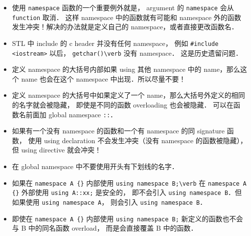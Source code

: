 
\begin{issues}
\issueDraft
\end{issues}

\begin{itemize}
\item 使用 \verb|namespace| 函数的一个重要例外就是， argument 的 \verb|namespace| 会从 \verb|function| 取消． 这样 namespace 中的函数就有可能和 namespace 外的函数发生冲突！解决的办法就是定义自己的 namespace，或者直接更改函数名．
\item STL 中 include 的 c header 并没有任何 namespace， 例如 \verb|#include <iostream>| 以后， \verb|getchar()\verb| 没有 namespace． 这是历史遗留问题．
\item 定义 namespace 的大括号内部如果 using 其他 namespace 中的 name，那么这个 name 也会在这个 namespace 中出现．所以尽量不要！
\item 定义 namespace 的大括号中如果定义了一个 name，那么大括号外定义的相同的名字就会被隐藏， 即使是不同的函数 overloading 也会被隐藏． 可以在函数名前面加 global namespace \verb|::|．
\item 如果有一个没有 namespace 的函数和一个有 namespace 的同 signature 函数， 使用 using declaration 不会发生冲突（没有 namespace 的函数被隐藏），但 using directive 就会冲突！
\item 在 global namespace 中不要使用开头有下划线的名字．
\item 如果在 \verb|namespace A {}| 内部使用 \verb|using namespace B;\verb| 在 \verb|namespace A {}| 外部使用 \verb|using A::xx;| 是安全的， 即不会引入 \verb|using namespace B|．但如果使用 \verb|using namespace A|， 则会引入 \verb|using namespace B|．
\item 即使在 \verb|namespace A {}| 内部使用 \verb|using namespace B;|  新定义的函数也不会与 B 中的同名函数 overload， 而是会直接覆盖 B 中的函数．
\end{itemize}
